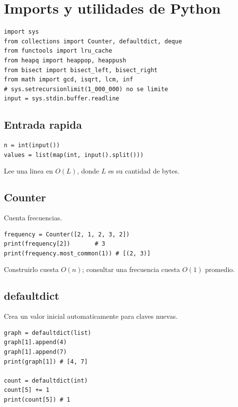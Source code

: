 \section{Imports y utilidades de Python}

\begin{lstlisting}[style=py]
import sys
from collections import Counter, defaultdict, deque
from functools import lru_cache
from heapq import heappop, heappush
from bisect import bisect_left, bisect_right
from math import gcd, isqrt, lcm, inf
# sys.setrecursionlimit(1_000_000) no se limite
input = sys.stdin.buffer.readline
\end{lstlisting}

\subsection{Entrada rapida}

\begin{lstlisting}[style=py]
n = int(input())
values = list(map(int, input().split()))
\end{lstlisting}

Lee una linea en $O(L)$, donde $L$ es su cantidad de bytes.

\subsection{Counter}

Cuenta frecuencias.

\begin{lstlisting}[style=py]
frequency = Counter([2, 1, 2, 3, 2])
print(frequency[2])       # 3
print(frequency.most_common(1)) # [(2, 3)]
\end{lstlisting}

Construirlo cuesta $O(n)$; consultar una frecuencia cuesta $O(1)$ promedio.

\subsection{defaultdict}

Crea un valor inicial automaticamente para claves nuevas.

\begin{lstlisting}[style=py]
graph = defaultdict(list)
graph[1].append(4)
graph[1].append(7)
print(graph[1]) # [4, 7]

count = defaultdict(int)
count[5] += 1
print(count[5]) # 1
\end{lstlisting}

